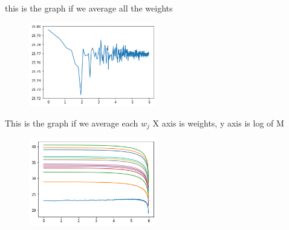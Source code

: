 \documentclass[letterpaper]{article}
\begin{document}
this is the graph if we average all the weights
\begin{figure}[H]
\centering
\includegraphics[width=0.5\textwidth]{q3_final.png}
\caption{\label{}}
\end{figure}

This is the graph if we average each $w_{j}$
X axis is weights, y axis is log of M

\begin{figure}[H]
\centering
\includegraphics[width=0.5\textwidth]{q3_f2.png}
\caption{\label{fig:q3}}
\end{figure}








\end{document}
